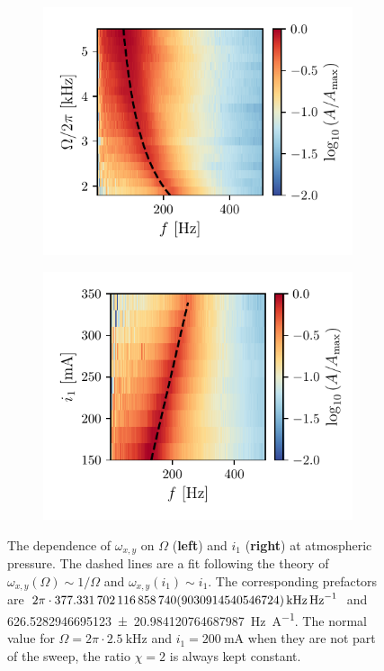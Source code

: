 \begin{figure}
    \centering
    \begin{subfigure}{0.45\textwidth}
        \includegraphics{figures/data/xy_mode_dependence_on_driving_frequency.pdf}
    \end{subfigure}
    \begin{subfigure}{0.45\textwidth}
        \includegraphics{figures/data/xy_mode_dependence_on_inner_current.pdf}
    \end{subfigure}
    \caption{The dependence of $\omega_{x,y}$ on $\Omega$ (\textbf{left}) and $i_1$ (\textbf{right}) at atmospheric pressure. The dashed lines are a fit following the theory of $\omega_{x,y}(\Omega) \sim 1 / \Omega$ and $\omega_{x,y}(i_1) \sim i_1$. The corresponding prefactors are $2\pi \cdot \qty{377.33170211685874\pm9.030914540546724}{\kilo\hertz\per\hertz}$ and \qty{626.5282946695123\pm20.984120764687987}{\hertz\per\ampere}. The normal value for $\Omega = 2\pi \cdot \qty{2.5}{\kilo\hertz}$ and $i_1 = \qty{200}{\milli\ampere}$ when they are not part of the sweep, the ratio $\chi = 2$ is always kept constant.}
    \label{fig:xy-mode-dependence-1bar}
\end{figure}

